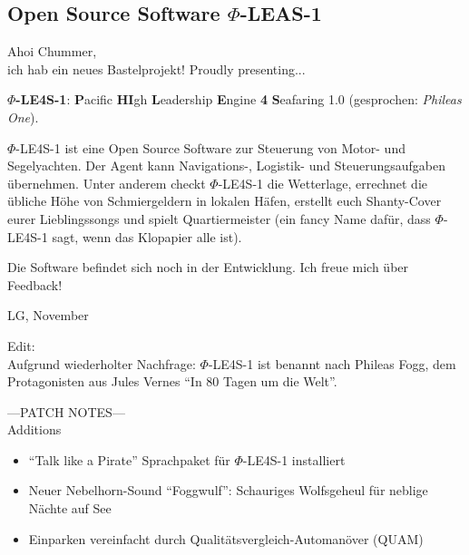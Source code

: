\documentclass[final]{multiversum}
\begin{document}
\makemultititle
%

\subsection{Open Source Software $\Phi$-LEAS-1}
Ahoi Chummer,\\
ich hab ein neues Bastelprojekt! Proudly presenting...

\textbf{$\Phi$-LE4S-1}: \textbf{P}acific \textbf{HI}gh \textbf{L}eadership
\textbf{E}ngine \textbf{4} \textbf{S}eafaring 1.0 (gesprochen: \textit{Phileas
One}).

$\Phi$-LE4S-1 ist eine Open Source Software zur Steuerung von Motor- und
Segelyachten. Der Agent kann Navigations-, Logistik- und Steuerungsaufgaben
übernehmen. Unter anderem checkt $\Phi$-LE4S-1 die Wetterlage, errechnet die
übliche Höhe von Schmiergeldern in lokalen Häfen,  erstellt euch Shanty-Cover
eurer Lieblingssongs und spielt Quartiermeister (ein fancy Name dafür, dass
$\Phi$-LE4S-1 sagt, wenn das Klopapier alle ist).

Die Software befindet sich noch in der Entwicklung. Ich freue mich über Feedback!

LG, November

\bigskip

Edit:\\
Aufgrund wiederholter Nachfrage: $\Phi$-LE4S-1 ist benannt nach Phileas Fogg,
dem Protagonisten aus Jules Vernes \enquote{In 80 Tagen um die Welt}.


\bigskip

---PATCH NOTES---\\
Additions
\begin{itemize}
    \item \enquote{Talk like a Pirate} Sprachpaket für $\Phi$-LE4S-1 installiert
    \item Neuer Nebelhorn-Sound \enquote{Foggwulf}: Schauriges Wolfsgeheul für neblige
    Nächte auf See
    \item Einparken vereinfacht durch Qualitätsvergleich-Automanöver (QUAM)
\end{itemize}

\bigskip
\end{document}
